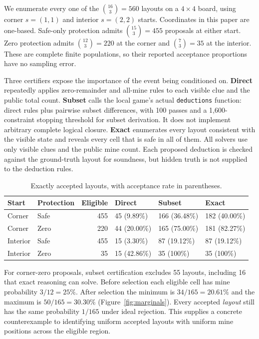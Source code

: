 \documentclass[11pt]{article}
\begin{document}
We enumerate every one of the $\binom{16}{3}=560$ layouts on a $4\times4$ board, using corner $s=(1,1)$ and interior $s=(2,2)$ starts. Coordinates in this paper are one-based. Safe-only protection admits $\binom{15}{3}=455$ proposals at either start. Zero protection admits $\binom{12}{3}=220$ at the corner and $\binom73=35$ at the interior. These are complete finite populations, so their reported acceptance proportions have no sampling error.

Three certifiers expose the importance of the event being conditioned on. \textbf{Direct} repeatedly applies zero-remainder and all-mine rules to each visible clue and the public total count. \textbf{Subset} calls the local game's actual \texttt{deductions} function: direct rules plus pairwise subset differences, with 100 passes and a 1,600-constraint stopping threshold for subset derivation. It does not implement arbitrary complete logical closure. \textbf{Exact} enumerates every layout consistent with the visible state and reveals every cell that is safe in all of them. All solvers use only visible clues and the public mine count. Each proposed deduction is checked against the ground-truth layout for soundness, but hidden truth is not supplied to the deduction rules.

\begin{table}[htbp]
\centering
\caption{Exactly accepted layouts, with acceptance rate in parentheses.}
\label{tab:enumeration}
\small
\begin{tabular}{llrlll}
\toprule
Start & Protection & Eligible & Direct & Subset & Exact\\
\midrule
Corner & Safe & 455 & 45 (9.89\%) & 166 (36.48\%) & 182 (40.00\%)\\
Corner & Zero & 220 & 44 (20.00\%) & 165 (75.00\%) & 181 (82.27\%)\\
Interior & Safe & 455 & 15 (3.30\%) & 87 (19.12\%) & 87 (19.12\%)\\
Interior & Zero & 35 & 15 (42.86\%) & 35 (100\%) & 35 (100\%)\\
\bottomrule
\end{tabular}
\end{table}

For corner-zero proposals, subset certification excludes 55 layouts, including 16 that exact reasoning can solve. Before selection each eligible cell has mine probability $3/12=25\%$. After selection the minimum is $34/165=20.61\%$ and the maximum is $50/165=30.30\%$ (Figure~\ref{fig:marginals}). Every accepted \emph{layout} still has the same probability $1/165$ under ideal rejection. This supplies a concrete counterexample to identifying uniform accepted layouts with uniform mine positions across the eligible region.
\end{document}
